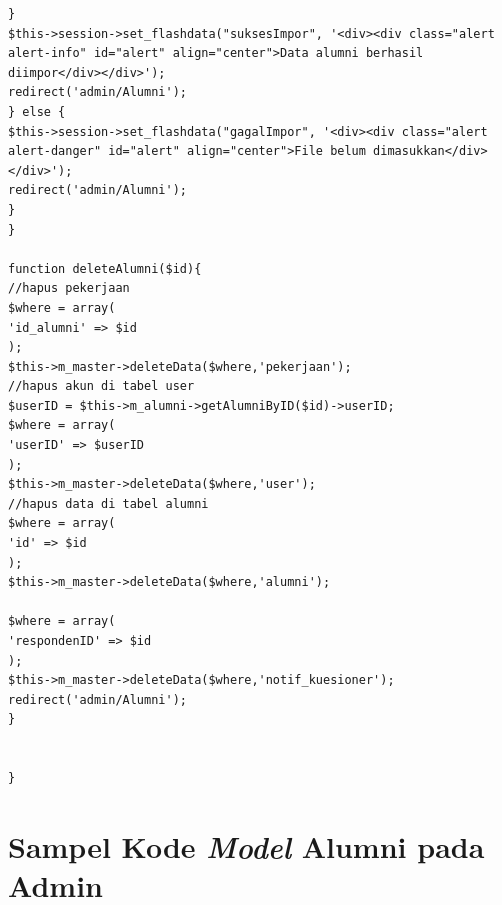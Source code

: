 \begin{verbatim}
}
$this->session->set_flashdata("suksesImpor", '<div><div class="alert alert-info" id="alert" align="center">Data alumni berhasil diimpor</div></div>');
redirect('admin/Alumni');
} else {
$this->session->set_flashdata("gagalImpor", '<div><div class="alert alert-danger" id="alert" align="center">File belum dimasukkan</div></div>');
redirect('admin/Alumni');
}
}

function deleteAlumni($id){
//hapus pekerjaan
$where = array(
'id_alumni' => $id
);
$this->m_master->deleteData($where,'pekerjaan');
//hapus akun di tabel user
$userID = $this->m_alumni->getAlumniByID($id)->userID;
$where = array(
'userID' => $userID
);
$this->m_master->deleteData($where,'user');
//hapus data di tabel alumni
$where = array(
'id' => $id
);
$this->m_master->deleteData($where,'alumni');

$where = array(
'respondenID' => $id
);
$this->m_master->deleteData($where,'notif_kuesioner');
redirect('admin/Alumni');
}


}

\end{verbatim}


\chapter{Sampel Kode \textit{Model} Alumni pada Admin}

